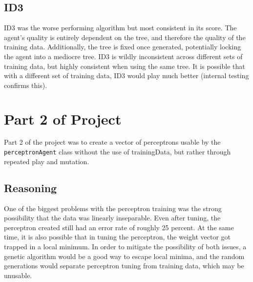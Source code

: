 \documentclass[a4paper]{article}
\begin{document}
\subsection{ID3}

ID3 was the worse performing algorithm but most consistent in its score.  The agent's quality is entirely dependent on the tree, and therefore the quality of the training data.  Additionally, the tree is fixed once generated, potentially locking the agent into a mediocre tree. ID3 is wildly inconsistent across different sets of training data, but highly consistent when using the same tree. It is possible that with a different set of training data, ID3 would play much better (internal testing confirms this).

\section{Part 2 of Project}

Part 2 of the project was to create a vector of perceptrons usable by the \texttt{perceptronAgent} class without the use of trainingData, but rather through repeated play and mutation.  

\subsection{Reasoning}One of the biggest problems with the perceptron training was the strong possibility that the data was linearly inseparable.  Even after tuning, the perceptron created still had an error rate of roughly 25 percent.  At the same time, it is also possible that in tuning the perceptron, the weight vector got trapped in a local minimum.  In order to mitigate the possibility of both issues, a genetic algorithm would be a good way to escape local minima, and the random generations would separate perceptron tuning from training data, which may be unusable.
\end{document}
